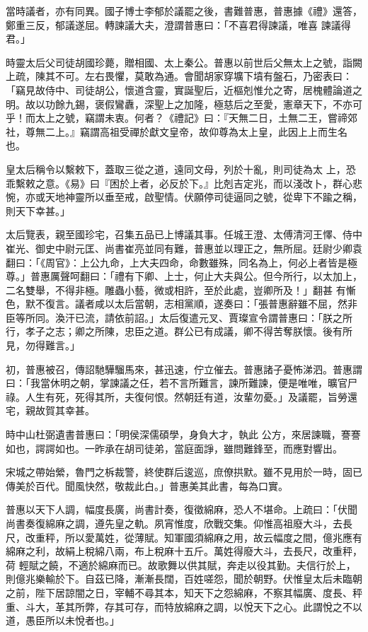 \begin{pinyinscope}
 當時議者，亦有同異。國子博士李郁於議罷之後，書難普惠，普惠據《禮》還答，鄭重三反，郁議遂屈。轉諫議大夫，澄謂普惠曰：「不喜君得諫議，唯喜
 諫議得君。」



 時靈太后父司徒胡國珍薨，贈相國、太上秦公。普惠以前世后父無太上之號，詣闕上疏，陳其不可。左右畏懼，莫敢為通。會聞胡家穿壙下墳有盤石，乃密表曰：「竊見故侍中、司徒胡公，懷道含靈，實誕聖后，近樞剋惟允之寄，居槐體論道之明。故以功餘九錫，褒假鸞纛，深聖上之加隆，極慈后之至愛，憲章天下，不亦可乎！而太上之號，竊謂未衷。何者？《禮記》曰：『天無二日，土無二王，嘗禘郊社，尊無二上。』竊謂高祖受禪於獻文皇帝，故仰尊為太上皇，此因上上而生名也。



 皇太后稱令以繫敕下，蓋取三從之道，遠同文母，列於十亂，則司徒為太
 上，恐乖繫敕之意。《易》曰『困於上者，必反於下。』比剋吉定兆，而以淺改卜，群心悲惋，亦或天地神靈所以垂至戒，啟聖情。伏願停司徒逼同之號，從卑下不踰之稱，則天下幸甚。」



 太后覽表，親至國珍宅，召集五品已上博議其事。任城王澄、太傅清河王懌、侍中崔光、御史中尉元匡、尚書崔亮並同有難，普惠並以理正之，無所屈。廷尉少卿袁翻曰：「《周官》：上公九命，上大夫四命，命數雖殊，同名為上，何必上者皆是極尊。」普惠厲聲呵翻曰：「禮有下卿、上士，何止大夫與公。但今所行，以太加上，二名雙舉，不得非極。雕蟲小藝，微或相許，至於此處，豈卿所及！」翻甚
 有慚色，默不復言。議者咸以太后當朝，志相黨順，遂奏曰：「張普惠辭雖不屈，然非臣等所同。渙汗已流，請依前詔。」太后復遣元叉、賈璨宣令謂普惠曰：「朕之所行，孝子之志；卿之所陳，忠臣之道。群公已有成議，卿不得苦奪朕懷。後有所見，勿得難言。」



 初，普惠被召，傳詔馳驊騮馬來，甚迅速，佇立催去。普惠諸子憂怖涕泗。普惠謂曰：「我當休明之朝，掌諫議之任，若不言所難言，諫所難諫，便是唯唯，曠官尸祿。人生有死，死得其所，夫復何恨。然朝廷有道，汝輩勿憂。」及議罷，旨勞還宅，親故賀其幸甚。



 時中山杜弼遺書普惠曰：「明侯深儒碩學，身負大才，執此
 公方，來居諫職，謇謇如也，諤諤如也。一昨承在胡司徒弟，當庭面諍，雖問難鋒至，而應對響出。



 宋城之帶始縈，魯門之柝裁警，終使群后逡巡，庶僚拱默。雖不見用於一時，固已傳美於百代。聞風快然，敬裁此白。」普惠美其此書，每為口實。



 普惠以天下人調，幅度長廣，尚書計奏，復徵綿麻，恐人不堪命。上疏曰：「伏聞尚書奏復綿麻之調，遵先皇之軌。夙宵惟度，欣戰交集。仰惟高祖廢大斗，去長尺，改重秤，所以愛萬姓，從薄賦。知軍國須綿麻之用，故云幅度之間，億兆應有綿麻之利，故絹上稅綿八兩，布上稅麻十五斤。萬姓得廢大斗，去長尺，改重秤，荷
 輕賦之饒，不適於綿麻而已。故歌舞以供其賦，奔走以役其勤。夫信行於上，則億兆樂輸於下。自茲已降，漸漸長闊，百姓嗟怨，聞於朝野。伏惟皇太后未臨朝之前，陛下居諒闇之日，宰輔不尋其本，知天下之怨綿麻，不察其幅廣、度長、秤重、斗大，革其所弊，存其可存，而特放綿麻之調，以悅天下之心。此謂悅之不以道，愚臣所以未悅者也。」




\end{pinyinscope}

